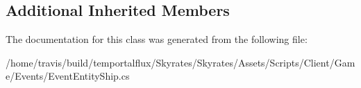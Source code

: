 \subsection*{Additional Inherited Members}


The documentation for this class was generated from the following file\-:\begin{DoxyCompactItemize}
\item 
/home/travis/build/temportalflux/\-Skyrates/\-Skyrates/\-Assets/\-Scripts/\-Client/\-Game/\-Events/Event\-Entity\-Ship.\-cs\end{DoxyCompactItemize}
